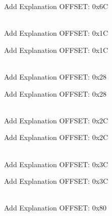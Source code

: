 \begin{DoxyRefList}
\label{todo__todo000118}%
%
Add Explanation OFFSET\+: 0x6C  
\item[{\parbox[t]{\linewidth}{Member \doxylink{struct_r_c_c___reg_def__t_ad0ee649244065b4f8f383335ef3e8b6c}{RCC\+\_\+\+Reg\+Def\+\_\+t\+::reserved1} }}]\hfill \\
\label{todo__todo000028}%
%
Add Explanation OFFSET\+: 0x1C 

\label{todo__todo000098}%
%
Add Explanation OFFSET\+: 0x1C  
\item[{\parbox[t]{\linewidth}{Member \doxylink{struct_r_c_c___reg_def__t_aba7ab871739e5698268555688d585826}{RCC\+\_\+\+Reg\+Def\+\_\+t\+::reserved2} }}]\hfill \\
\label{todo__todo000031}%
%
Add Explanation OFFSET\+: 0x28 

\label{todo__todo000101}%
%
Add Explanation OFFSET\+: 0x28  
\item[{\parbox[t]{\linewidth}{Member \doxylink{struct_r_c_c___reg_def__t_afff7063f5b644fb29e15036ae1db0a85}{RCC\+\_\+\+Reg\+Def\+\_\+t\+::reserved3} }}]\hfill \\
\label{todo__todo000032}%
%
Add Explanation OFFSET\+: 0x2C 

\label{todo__todo000102}%
%
Add Explanation OFFSET\+: 0x2C  
\item[{\parbox[t]{\linewidth}{Member \doxylink{struct_r_c_c___reg_def__t_a3478865b120b4d405fa9c36c4ae119bd}{RCC\+\_\+\+Reg\+Def\+\_\+t\+::reserved4} }}]\hfill \\
\label{todo__todo000036}%
%
Add Explanation OFFSET\+: 0x3C 

\label{todo__todo000106}%
%
Add Explanation OFFSET\+: 0x3C  
\item[{\parbox[t]{\linewidth}{Member \doxylink{struct_r_c_c___reg_def__t_a0addf6bf7447e8de71be463cbaa317f9}{RCC\+\_\+\+Reg\+Def\+\_\+t\+::SSCGR} }}]\hfill \\
\label{todo__todo000053}%
%
Add Explanation OFFSET\+: 0x80 


\end{DoxyRefList}
